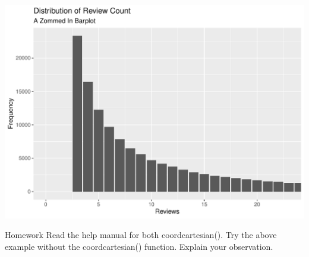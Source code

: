 \documentclass[12pt]{book}\usepackage{knitr}
\begin{document}
\begin{knitrout}
\begin{kframe}
{\ttfamily\noindent\color{warningcolor}{\#\# Warning: Use of `cleansedBusiness\$review\_count` is discouraged. Use `review\_count` instead.}}\end{kframe}
\includegraphics[width=\maxwidth]{figure/Zooming_In-1} 

\end{knitrout}

\begin{DIY}{Homework}
\noindent Read the help manual for both coord\textunderscore cartesian(). Try the above example without the coord\textunderscore cartesian() function. Explain your observation.
\end{DIY}

\newpage
\end{document}

